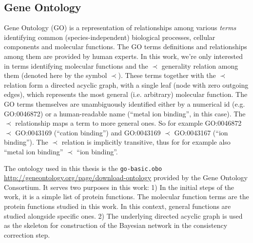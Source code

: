 \documentclass[11pt,twoside,a4paper]{book}
\begin{document}
\subsection{Gene Ontology}
\label{ssec:go}
Gene Ontology (GO) \cite{go} is a representation of relationships among various \emph{terms} identifying common (species-independent)
biological processes, cellular components and molecular functions.
The GO terms definitions and relationships among them are provided by human experts. 
In this work, we're only interested in terms identifying molecular functions and the $\prec$ generality relation among them
(denoted here by the symbol $\prec$).
These terms together with the $\prec$ relation form a directed acyclic graph, with a single leaf (node with zero outgoing edges),
which represents the
most general (i.e. arbitrary) molecular function. 
The GO terms themselves are unambiguously identified either by a numerical id (e.g. GO:0046872) or a human-readable name
(``metal ion binding'', in this case).
The $\prec$ relationship maps a term to more general ones. So for example GO:0046872 $\prec$ GO:0043169 (``cation binding'')
 and GO:0043169  $\prec$ GO:0043167 (``ion binding'').
 The $\prec$ relation is implicitly transitive,
 thus for for example also ``metal ion binding''  $\prec$ ``ion binding''.
 
The ontology used in this thesis is the \texttt{go-basic.obo} \cite{gores} \url{http://geneontology.org/page/download-ontology} provided by the Gene Ontology Consortium. 
It serves two purposes in this work:
1) In the initial steps of the work, it is a simple list of protein functions.
The molecular function terms are the protein functions studied in this work.
In this context, general functions are studied alongside specific ones. 
2) The underlying directed acyclic graph is used as the skeleton for construction of the 
Bayesian network in the consistency correction step. 
\end{document}
